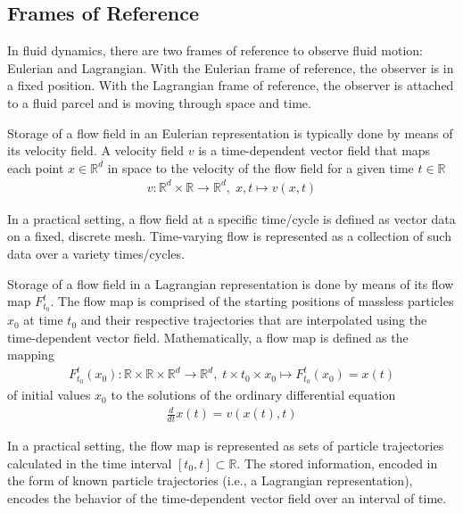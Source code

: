 \vspace{-1mm}
\subsection{Frames of Reference}
%
In fluid dynamics, there are two frames of reference to observe fluid motion: Eulerian and Lagrangian.
%
With the Eulerian frame of reference, the observer is in a fixed position.
%
With the Lagrangian frame of reference, the observer is attached to a fluid parcel and is moving through space and time.

%
Storage of a flow field in an Eulerian representation is typically done by means of its velocity field.
%
A velocity field $v$ is a time-dependent vector field that maps each point $x\in \mathbb R^d$ in space to the velocity of the flow field for a given time $t\in \mathbb R$
%
\begin{eqnarray}
{v} : \mathbb R^d \times \mathbb R \to \mathbb R^d,\; x,t \mapsto v(x,t)
\end{eqnarray}

%
In a practical setting, a flow field at a specific time/cycle is defined as vector data on a fixed, discrete mesh.
%
Time-varying flow is represented as a collection of such data over a variety times/cycles.


Storage of a flow field in a Lagrangian representation is done by means of its flow map $F_{t_0}^{t}$.
%
The flow map is comprised of the starting positions of massless particles $x_0$ at time $t_0$ and their respective trajectories that are interpolated using the time-dependent vector field.
%
Mathematically, a flow map is defined as the mapping
\begin{eqnarray}
F_{t_0}^{t}(x_0):\mathbb R \times \mathbb R \times \mathbb R^d \to \mathbb R^d,\; t \times t_0 \times x_0 \mapsto F_{t_0}^{t}(x_0) = x(t)
\end{eqnarray}
%
of initial values $x_0$ to the solutions of the ordinary differential equation
%
\begin{eqnarray}
\frac{d}{dt}x(t) = v(x(t),t)
\end{eqnarray}

In a practical setting, the flow map is represented as sets of particle trajectories calculated in the time interval $[t_0,t]\subset \mathbb R$.
%
The stored information, encoded in the form of known particle trajectories (i.e., a Lagrangian representation), encodes the behavior of the time-dependent vector field over an interval of time.
%
